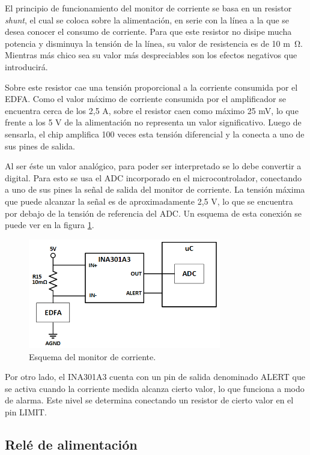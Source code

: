 El principio de funcionamiento del monitor de corriente se basa en un resistor \textit{shunt}, el cual se coloca sobre la alimentación, en serie con la línea a la que se desea conocer el consumo de corriente. Para que este resistor no disipe mucha potencia y disminuya la tensión de la línea, su valor de resistencia es de 10 \si{m\ohm}. Mientras más chico sea su valor más despreciables son los efectos negativos que introducirá.

Sobre este resistor cae una tensión proporcional a la corriente consumida por el EDFA. Como el valor máximo de corriente consumida por el amplificador se encuentra cerca de los 2,5 A, sobre el resistor caen como máximo 25 mV, lo que frente a los 5 V de la alimentación no representa un valor significativo. Luego de sensarla, el chip amplifica 100 veces esta tensión diferencial y la conecta a uno de sus pines de salida.

Al ser éste un valor analógico, para poder ser interpretado se lo debe convertir a digital. Para esto se usa el ADC incorporado en el microcontrolador, conectando a uno de sus pines la señal de salida del monitor de corriente. La tensión máxima que puede alcanzar la señal es de aproximadamente 2,5 V, lo que se encuentra por debajo de la tensión de referencia del ADC. Un esquema de esta conexión se puede ver en la figura \ref{fig:funcMonitor}.

\begin{figure}[H]
\centering
\includegraphics[width=0.75\textwidth]{./Figures/func_monitor.png}
\caption{Esquema del monitor de corriente.}
\label{fig:funcMonitor}
\end{figure}

Por otro lado, el INA301A3 cuenta con un pin de salida denominado ALERT que se activa cuando la corriente medida alcanza cierto valor, lo que funciona a modo de alarma. Este nivel se determina conectando un resistor de cierto valor en el pin LIMIT.

\subsection{Relé de alimentación}

